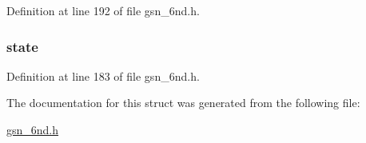 Definition at line 192 of file gsn\_\-6nd.h.

\hypertarget{a00194_a6e9c4cbd32a1178b12f3a61f6855c896}{
\subsubsection[{state}]{ {\bf state}}}
\label{a00194_a6e9c4cbd32a1178b12f3a61f6855c896}


Definition at line 183 of file gsn\_\-6nd.h.



The documentation for this struct was generated from the following file:\begin{DoxyCompactItemize}
\item 
\hyperlink{a00473}{gsn\_\-6nd.h}\end{DoxyCompactItemize}
